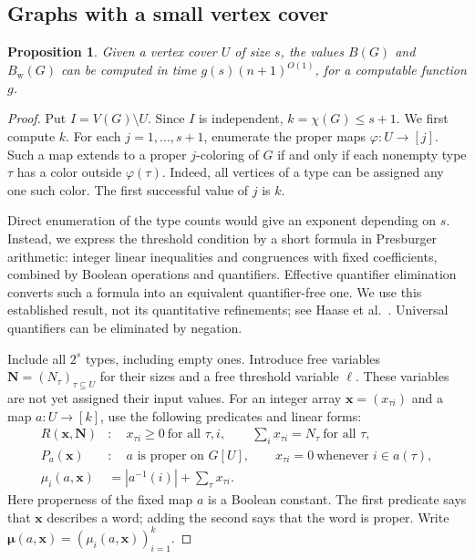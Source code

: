 \documentclass[10pt,a4paper]{amsart}
\numberwithin{equation}{section}
\newtheorem{proposition}[theorem]{Proposition}
\theoremstyle{definition}
\theoremstyle{remark}
\begin{document}
\subsection{Graphs with a small vertex cover}

\begin{proposition}\label{rec:cover}
Given a vertex cover $U$ of size $s$, the values $B(G)$ and $B_{\mathrm w}(G)$
can be computed in time $g(s)(n+1)^{O(1)}$, for a computable function $g$.
\end{proposition}
\begin{proof}
Put $I=V(G)\setminus U$. Since $I$ is independent,
$k=\chi(G)\leq s+1$. We first compute $k$. For each
$j=1,\ldots,s+1$, enumerate the proper maps $\varphi:U\to[j]$.
Such a map extends to a proper $j$-coloring of $G$ if and only if
each nonempty type $\tau$ has a color outside $\varphi(\tau)$.
Indeed, all vertices of a type can be assigned any one such color.
The first successful value of $j$ is $k$.

Direct enumeration of the type counts would give an exponent depending
on $s$. Instead, we express the threshold condition by a short formula
in Presburger arithmetic: integer linear inequalities and congruences
with fixed coefficients, combined by Boolean operations and quantifiers.
Effective quantifier elimination converts such a formula into an
equivalent quantifier-free one. We use this established result, not
its quantitative refinements; see Haase et al.~\cite[Corollary~3.2]{haase2024}.
Universal quantifiers can be eliminated by negation.

Include all $2^s$ types, including empty ones. Introduce free variables
$\mathbf N=(N_\tau)_{\tau\subseteq U}$ for their sizes and a free
threshold variable $\ell$. These variables are not yet assigned their
input values. For an integer array $\mathbf x=(x_{\tau i})$ and a
map $a:U\to[k]$, use the following predicates and linear forms:
\[
\begin{aligned}
R(\mathbf x,\mathbf N)
&:\quad x_{\tau i}\geq0\ \text{for all }\tau,i,\qquad
          \sum_i x_{\tau i}=N_\tau\ \text{for all }\tau,\\
P_a(\mathbf x)
&:\quad a\text{ is proper on }G[U],\qquad
          x_{\tau i}=0\ \text{whenever }i\in a(\tau),\\
\mu_i(a,\mathbf x)&=|a^{-1}(i)|+\sum_\tau x_{\tau i}.
\end{aligned}
\]
Here properness of the fixed map $a$ is a Boolean constant.
The first predicate says that $\mathbf x$ describes a word; adding
the second says that the word is proper. Write
$\boldsymbol\mu(a,\mathbf x)=(\mu_i(a,\mathbf x))_{i=1}^k$.


\end{proof}
\end{document}
